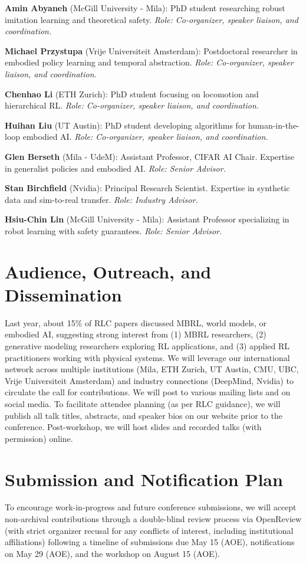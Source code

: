 \documentclass[10pt]{article} %
\begin{document}
\textbf{Amin Abyaneh} (McGill University - Mila): PhD student researching robust imitation learning and theoretical safety. \textit{Role: Co-organizer, speaker liaison, and coordination.}

    
\textbf{Michael Przystupa} (Vrije Universiteit Amsterdam): Postdoctoral researcher in embodied policy learning and temporal abstraction. \textit{Role: Co-organizer, speaker liaison, and coordination.}

\textbf{Chenhao Li} (ETH Zurich): PhD student focusing on locomotion and hierarchical RL. \textit{Role: Co-organizer, speaker liaison, and coordination.}

\textbf{Huihan Liu} (UT Austin): PhD student developing algorithms for human-in-the-loop embodied AI. \textit{Role: Co-organizer, speaker liaison, and coordination.}

\textbf{Glen Berseth} (Mila - UdeM): Assistant Professor, CIFAR AI Chair. Expertise in generalist policies and embodied AI. \textit{Role: Senior Advisor.}

\textbf{Stan Birchfield} (Nvidia): Principal Research Scientist. Expertise in synthetic data and sim-to-real transfer. \textit{Role: Industry Advisor.}

\textbf{Hsiu-Chin Lin} (McGill University - Mila): Assistant Professor specializing in robot learning with safety guarantees. \textit{Role: Senior Advisor.}


\section{Audience, Outreach, and Dissemination}
Last year, about 15\% of RLC papers discussed MBRL, world models, or embodied AI, suggesting strong interest from (1) MBRL researchers, (2) generative modeling researchers exploring RL applications, and (3) applied RL practitioners working with physical systems.
We will leverage our international network across multiple institutions (Mila, ETH Zurich, UT Austin, CMU, UBC, Vrije Universiteit Amsterdam) and industry connections (DeepMind, Nvidia) to circulate the call for contributions. We will post to various mailing lists and on social media.
To facilitate attendee planning (as per RLC guidance), we will publish all talk titles, abstracts, and speaker bios on our website prior to the conference. Post-workshop, we will host slides and recorded talks (with permission) online.

\section{Submission and Notification Plan}
To encourage work-in-progress and future conference submissions, we will accept non-archival contributions through a double-blind review process via OpenReview (with strict organizer recusal for any conflicts of interest, including institutional affiliations) following a timeline of submissions due May 15 (AOE), notifications on May 29 (AOE), and the workshop on August 15 (AOE).
\end{document}

